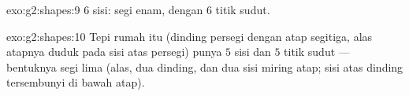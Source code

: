 \begin{solution}{exo:g2:shapes:9}
$6$ sisi: segi enam, dengan $6$ titik sudut.
\end{solution}

\begin{solution}{exo:g2:shapes:10}
Tepi rumah itu (dinding persegi dengan atap segitiga, alas atapnya
duduk pada sisi atas persegi) punya $5$ sisi dan $5$ titik sudut ---
bentuknya segi lima (alas, dua dinding, dan dua sisi miring atap;
sisi atas dinding tersembunyi di bawah atap).

\end{solution}
